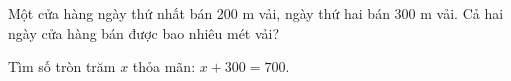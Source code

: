\begin{ex} %
Một cửa hàng ngày thứ nhất bán 200 m vải, ngày thứ hai bán 300 m vải. Cả hai ngày cửa hàng bán được bao nhiêu mét vải?
\end{ex}

\begin{ex} %
Tìm số tròn trăm $x$ thỏa mãn: $x + 300 = 700$.
\end{ex}
